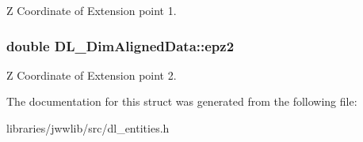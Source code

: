 Z Coordinate of Extension point 1. \hypertarget{structDL__DimAlignedData_a8a9851d99e312e91e64cd57337b79e63}{
\subsubsection[{epz2}]{\setlength{\rightskip}{0pt plus 5cm}double D\-L\-\_\-\-Dim\-Aligned\-Data\-::epz2}}\label{structDL__DimAlignedData_a8a9851d99e312e91e64cd57337b79e63}
Z Coordinate of Extension point 2. 

The documentation for this struct was generated from the following file\-:\begin{DoxyCompactItemize}
\item 
libraries/jwwlib/src/dl\-\_\-entities.\-h\end{DoxyCompactItemize}
